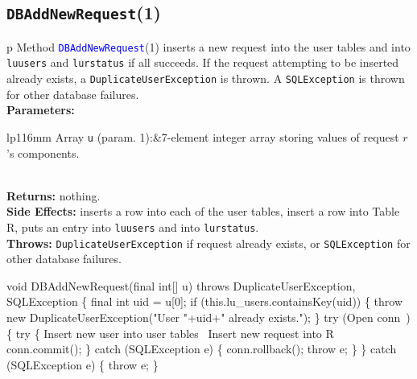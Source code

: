 \subsection{\texttt{DBAddNewRequest}(1)}
\begin{tabular}{p{\textwidth}}
\toprule
{}
Method \textcolor{blue}{{\tt{}\protect{}DBAddNewRequest}}(1) inserts a new request into the
user tables and into {\tt{}lu{}users} and {\tt{}lu{}rstatus} if all succeeds.  If the
request attempting to be inserted already exists, a {\tt{}DuplicateUserException}
is thrown. A {\tt{}SQLException} is thrown for other database failures.\\
\midrule
\textbf{Parameters:} \\
\begin{tabular}{lp{116mm}}
Array {\tt{}u} (param. 1):&7-element integer array storing values of
request $r$'s components.

\end{tabular}\\
\textbf{Returns:} nothing.\\
\textbf{Side Effects:} inserts a row into each of the user tables, insert a
row into Table R, puts an entry into {\tt{}lu{}users} and into {\tt{}lu{}rstatus}.\\
\textbf{Throws:} {\tt{}DuplicateUserException} if request already exists, or
{\tt{}SQLException} for other database failures.\\
\bottomrule
\end{tabular}
\nwenddocs{}\endmoddef{}
void DBAddNewRequest(final int[] u)
throws DuplicateUserException, SQLException \{
  final int uid = u[0];
  if (this.lu_users.containsKey(uid)) \{
    throw new DuplicateUserException("User "+uid+" already exists.");
  \}
  try (\LA{}Open \code{}conn\edoc{}~{\nwtagstyle{}}\RA{}) \{
    try \{
      \LA{}Insert new user into user tables~{\nwtagstyle{}}\RA{}
      \LA{}Insert new request into R~{\nwtagstyle{}}\RA{}
      conn.commit();
    \} catch (SQLException e) \{
      conn.rollback();
      throw e;
    \}
  \} catch (SQLException e) \{
    throw e;
  \}
\eatline
{}\nwendcode{}

